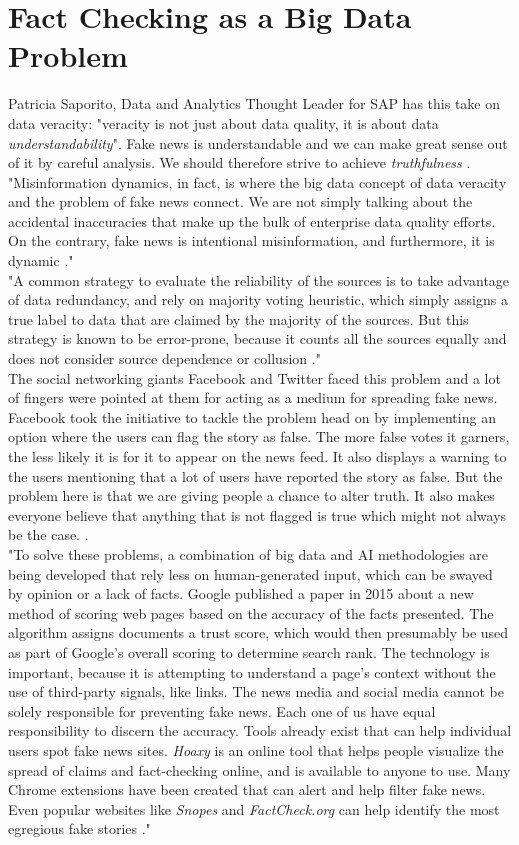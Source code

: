 \documentclass[sigconf]{acmart}
\begin{document}
\section{Fact Checking as a Big Data Problem}
Patricia Saporito, Data and Analytics Thought Leader for SAP has this take on data veracity: "veracity is not just about data quality, it is about data \textit{understandability}". Fake news is understandable and we can make great sense out of it by careful analysis. We should therefore strive to achieve \textit{truthfulness} \cite{www-forbes2}. "Misinformation dynamics, in fact, is where the big data concept of data veracity and the problem of fake news connect. We are not simply talking about the accidental inaccuracies that make up the bulk of enterprise data quality efforts. On the contrary, fake news is intentional misinformation, and furthermore, it is dynamic \cite{www-forbes2}." \\
"A common strategy to evaluate the reliability of the sources is to take advantage of data redundancy, and rely on majority voting heuristic, which simply assigns a true label to data that are claimed by the majority of the sources. But this strategy is known to be error-prone, because it counts all the sources equally and does not consider source dependence or collusion \cite{www-forbes1}." \\
The social networking giants Facebook and Twitter faced this problem and a lot of fingers were pointed at them for acting as a medium for spreading fake news. Facebook took the initiative to tackle the problem head on by implementing an option where the users can flag the story as false. The more false votes it garners, the less likely it is for it to appear on the news feed. It also displays a warning to the users mentioning that a lot of users have reported the story as false. But the problem here is that we are giving people a chance to alter truth. It also makes everyone believe that anything that is not flagged is true which might not always be the case. \cite{www-forbes2}. \\
"To solve these problems, a combination of big data and AI methodologies are being developed that rely less on human-generated input, which can be swayed by opinion or a lack of facts. Google published a paper in 2015 about a new method of scoring web pages based on the accuracy of the facts presented. The algorithm assigns documents a trust score, which would then presumably be used as part of Google’s overall scoring to determine search rank. The technology is important, because it is attempting to understand a page’s context without the use of third-party signals, like links. 
The news media and social media cannot be solely responsible for preventing fake news. Each one of us have equal responsibility to discern the accuracy. Tools already exist that can help individual users spot fake news sites. \textit{Hoaxy} is an online tool that helps people visualize the spread of claims and fact-checking online, and is available to anyone to use. Many Chrome extensions have been created that can alert and help filter fake news. Even popular websites like \textit{Snopes} and \textit{FactCheck.org} can help identify the most egregious fake stories \cite{www-forbes2}." 
\end{document}
